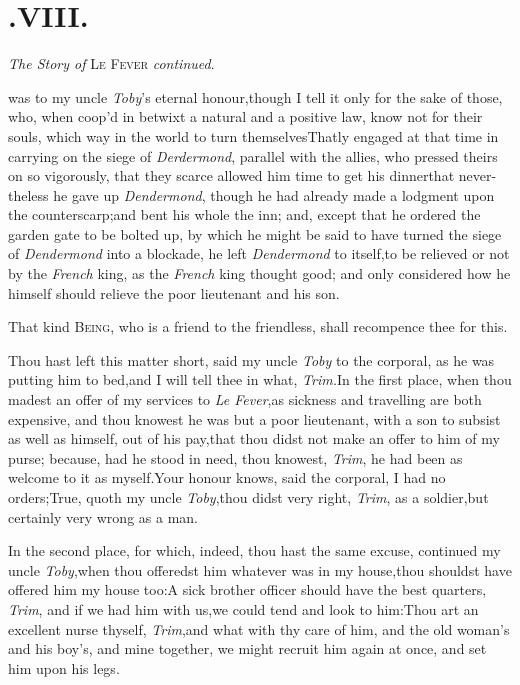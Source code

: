 \documentclass{article}
\begin{document}
\section{.\enspace VIII.}
\centerline{\textit{The Story of} \textsc{Le Fever} \textit{continued}.}

 was to my uncle
\textit{Toby}’s eternal ho\-nour,\tsh though I tell it
only for the sake of those, who, when coop’d in betwixt a
natural and a positive law, know not for their souls, which way in
the world to turn themselves\tsk That\break{}\break ly engaged at that time in carrying on
the siege of \textit{Derdermond}\sic, parallel with the allies, who
pressed theirs on so vigo\-rously, that they scarce allowed him\break
time to get his dinner\tsh that never-\break
theless he gave up \textit{Dendermond}, though\break
he had already made a lodgment upon\break
the counterscarp;\tsh and bent his whole\break
{}\break
the inn; and, except that he ordered\break
the garden gate to be bolted up, by\break
which he might be said to have turned\break
the siege of \textit{Dendermond} into a blockade,\break
\tsk he left \textit{Dendermond} to itself,\tsk to be\break
relieved or not by the \textit{French} king, as\break
the \textit{French} king thought good; and\break
only considered how he himself should\break
relieve the poor lieutenant and his son.\etp{}

\tsh That kind \textsc{Being}, who is a friend to
the friendless, shall recompence thee for this.

Thou hast left this matter short, said my uncle \textit{Toby} to
the corporal, as he was putting him to bed,\tsh and I will
tell thee in what, \textit{Trim.}\tsh In the first place,
when thou madest an offer of my services to \textit{Le
Fever},\tsh as sickness and travelling are both
expensive, and thou knowest he was but a poor lieutenant, with a
son to subsist as well as himself, out of his pay,\tsk that thou
didst not make an offer to him of my purse; because, had he stood
in need, thou knowest, \textit{Trim}, he had been as welcome to it as
myself.\tsh Your honour knows, said the corporal, I had no
orders;\tsh True, quoth my uncle \textit{Toby},\tsk thou
didst very right, \textit{Trim}, as a soldier,\tsk but certainly
very wrong as a man.

In the second place, for which, indeed, thou hast the same
excuse, continued my uncle \textit{Toby},\tsh when thou
offeredst him whatever was in my house,\tsk thou shouldst
have offered him my house too:\break\tsh A sick brother officer
should have the best quarters, \textit{Trim}, and if we had him with
us,\tsk we could tend and look to him:\tsh Thou art an
excellent nurse thyself, \textit{Trim},\tsk and what with thy care
of him, and the old woman’s and his boy’s, and mine
together, we might recruit him again at once, and set him upon his
legs.\tsh
\end{document}
